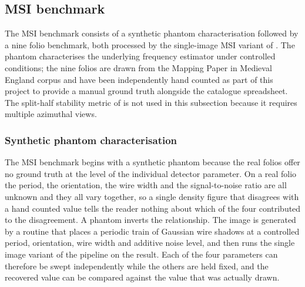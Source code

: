\subsection{MSI benchmark}
\label{sec:benchmark:msi}

The MSI benchmark consists of a synthetic phantom characterisation
followed by a nine folio benchmark, both processed by
the single-image MSI variant of . The
phantom characterises the underlying frequency estimator under
controlled conditions; the nine folios are drawn from the Mapping
Paper in Medieval England corpus and have been independently
hand counted as part of this project to provide a
manual ground truth alongside the catalogue spreadsheet. The
split-half stability metric of 
is not used in this subsection because it requires multiple
azimuthal views.


\subsubsection{Synthetic phantom characterisation}
\label{sec:benchmark:msi:phantom}

The MSI benchmark begins with a synthetic phantom because the real
folios offer no ground truth at the level of the individual
detector parameter. On a real folio the period, the orientation,
the wire width and the signal-to-noise ratio are all unknown and
they all vary together, so a single density figure that disagrees
with a hand counted value tells the reader nothing about which of the four
contributed to the disagreement. A phantom inverts the
relationship. The image is generated by a routine that places a
periodic train of Gaussian wire shadows at a controlled period,
orientation, wire width and additive noise level, and then
runs the single image variant of the pipeline on the result. Each
of the four parameters can therefore be swept independently while
the others are held fixed, and the recovered value can be compared
against the value that was actually drawn.

